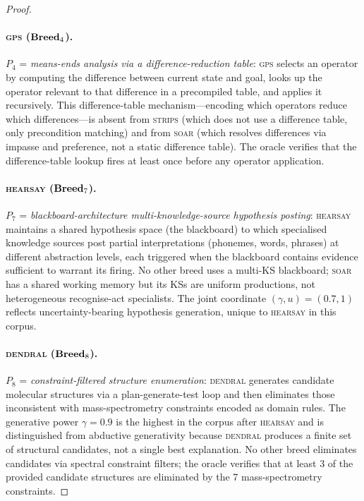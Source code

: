 \begin{proof}
\paragraph{\textsc{gps} ($\mathbf{Breed}_4$).}
$P_4$ = \emph{means-ends analysis via a difference-reduction table}: \textsc{gps}
selects an operator by computing the difference between current state and goal, looks up
the operator relevant to that difference in a precompiled table, and applies it
recursively. This difference-table mechanism---encoding which operators reduce which
differences---is absent from \textsc{strips} (which does not use a difference table, only
precondition matching) and from \textsc{soar} (which resolves differences via impasse
and preference, not a static difference table). The oracle verifies that the
difference-table lookup fires at least once before any operator application.

\paragraph{\textsc{hearsay} ($\mathbf{Breed}_7$).}
$P_7$ = \emph{blackboard-architecture multi-knowledge-source hypothesis posting}:
\textsc{hearsay} maintains a shared hypothesis space (the blackboard) to which
specialised knowledge sources post partial interpretations (phonemes, words, phrases) at
different abstraction levels, each triggered when the blackboard contains evidence
sufficient to warrant its firing. No other breed uses a multi-KS blackboard; \textsc{soar}
has a shared working memory but its KSs are uniform productions, not heterogeneous
recognise-act specialists. The joint coordinate $(\gamma, u) = (0.7, 1)$ reflects
uncertainty-bearing hypothesis generation, unique to \textsc{hearsay} in this corpus.

\paragraph{\textsc{dendral} ($\mathbf{Breed}_8$).}
$P_8$ = \emph{constraint-filtered structure enumeration}: \textsc{dendral} generates
candidate molecular structures via a plan-generate-test loop and then eliminates those
inconsistent with mass-spectrometry constraints encoded as domain rules. The generative
power $\gamma = 0.9$ is the highest in the corpus after \textsc{hearsay} and is
distinguished from abductive generativity because \textsc{dendral} produces a finite set
of structural candidates, not a single best explanation. No other breed eliminates
candidates via spectral constraint filters; the oracle verifies that at least 3 of the
provided candidate structures are eliminated by the 7 mass-spectrometry constraints.


\end{proof}
